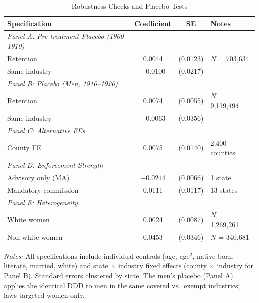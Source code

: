 \begin{table}[t]
\centering
\caption{Robustness Checks and Placebo Tests}
\label{tab:robustness}
\begin{tabular}{lccl}
\toprule
Specification & Coefficient & SE & Notes \\
\midrule
\textit{Panel A: Pre-treatment Placebo (1900--1910)} \\[3pt]
Retention & 0.0044 & (0.0123) & $N$ = 703,634 \\
Same industry & $-0.0100$ & (0.0217) & \\
\midrule
\textit{Panel B: Placebo (Men, 1910--1920)} \\[3pt]
Retention & 0.0074 & (0.0055) & $N$ = 9,119,494 \\
Same industry & $-0.0063$ & (0.0356) & \\
\midrule
\textit{Panel C: Alternative FEs} \\[3pt]
County FE & 0.0075 & (0.0140) & 2,400 counties \\
\midrule
\textit{Panel D: Enforcement Strength} \\[3pt]
Advisory only (MA) & $-0.0214$ & (0.0066) & 1 state \\
Mandatory commission & 0.0111 & (0.0117) & 13 states \\
\midrule
\textit{Panel E: Heterogeneity} \\[3pt]
White women & 0.0024 & (0.0087) & $N$ = 1,269,261 \\
Non-white women & 0.0453 & (0.0346) & $N$ = 340,681 \\
\bottomrule
\end{tabular}
\begin{tablenotes}
\small
\item \textit{Notes:} All specifications include individual controls (age, age$^2$,
native-born, literate, married, white) and state $\times$ industry fixed effects
(county $\times$ industry for Panel B). Standard errors clustered by state.
The men's placebo (Panel A) applies the identical DDD to men in the same covered
vs.\ exempt industries; laws targeted women only.
\end{tablenotes}
\end{table}
